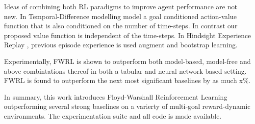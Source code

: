 Ideas of combining both RL paradigms to improve agent performance are
not new. In Temporal-Difference modelling \cite{pong2018temporal} 
model a goal conditioned action-value function that is also conditioned
on the number of time-steps. In contrast our proposed value function
is independent of the time-steps.
In Hindsight Experience Replay \cite{andrychowicz2016learning},
previous episode experience is used augment and bootstrap learning. 

Experimentally, FWRL is shown to outperform both model-based, model-free
and above combintations thereof in both a tabular and neural-network
based setting. FWRL is found to outperform the next most significant
baselines by as much x\%.


In summary, this work introduces Floyd-Warshall Reinforcement Learning
outperforming several strong baselines on a varierty of multi-goal
reward-dynamic environments. The experimentation suite and all code is
made available.










